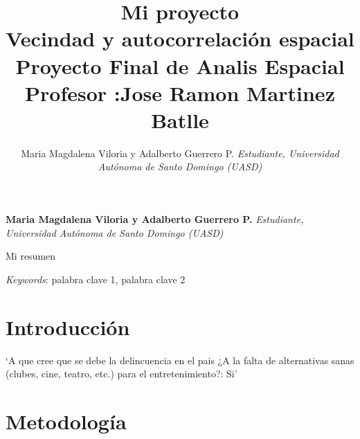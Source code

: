 \documentclass[11pt,]{article}
\title{Mi proyecto\\
Vecindad y autocorrelación espacial\\
Proyecto Final de Analis Espacial\\
Profesor :Jose Ramon Martinez Batlle  }
\author{\Large Maria Magdalena Viloria y Adalberto Guerrero P.\vspace{0.05in} \newline\normalsize\emph{Estudiante, Universidad Autónoma de Santo Domingo (UASD)}  }
\date{}
\newcommand*{\authorfont}{\fontfamily{phv}\selectfont}
\renewenvironment{abstract}
 {{%
    \setlength{\leftmargin}{0mm}
    \setlength{\rightmargin}{\leftmargin}%
  }%
  \relax}
 {\endlist}
\begin{document}
	
%

{%
\setlength{\parindent}{0pt}
\thispagestyle{plain}
{\fontsize{18}{20}\selectfont\raggedright 
\maketitle  %

}

{
   \vskip 13.5pt\relax \normalsize\fontsize{11}{12} 
\textbf{\authorfont Maria Magdalena Viloria y Adalberto Guerrero P.} \hskip 15pt \emph{\small Estudiante, Universidad Autónoma de Santo Domingo (UASD)}   

}

}








\begin{abstract}

    \hbox{\vrule height .2pt width 39.14pc}

    \vskip 8.5pt %

\noindent Mi resumen


\vskip 8.5pt \noindent \emph{Keywords}: palabra clave 1, palabra clave 2 \par

    \hbox{\vrule height .2pt width 39.14pc}



\end{abstract}


\vskip 6.5pt


\noindent  \section{Introducción}\label{introducciuxf3n}

`A que cree que se debe la delincuencia en el pais ¿A la falta de
alternativas sanas (clubes, cine, teatro, etc.) para el
entretenimiento?: Si'

\section{Metodología}\label{metodologuxeda}
\end{document}
